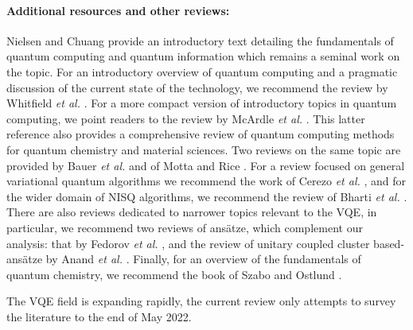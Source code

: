 \paragraph{Additional resources and other reviews:} Nielsen and Chuang \cite{nielsenQuantumComputationQuantum2010} provide an introductory text detailing the fundamentals of quantum computing and quantum information which remains a seminal work on the topic. For an introductory overview of quantum computing and a pragmatic discussion of the current state of the technology, we recommend the review by Whitfield {\it et al.} \cite{Whitfield2022}. For a more compact version of introductory topics in quantum computing, we point readers to the review by McArdle {\it et al.} \cite{mcardleQuantumComputationalChemistry2018}. This latter reference also provides a comprehensive review of quantum computing methods for quantum chemistry and material sciences. Two reviews on the same topic are provided by Bauer {\it et al.} \cite{bauerQuantumAlgorithmsQuantum2020} and of Motta and Rice \cite{Motta2021_review}. For a review focused on general variational quantum algorithms we recommend the work of Cerezo {\it et al.} \cite{cerezoVariationalQuantumAlgorithms2020}, and for the wider domain of NISQ algorithms, we recommend the review of Bharti {\it et al.} \cite{Bharti2021_review}. There are also reviews dedicated to narrower topics relevant to the VQE, in particular, we recommend two reviews of ans{\"{a}}tze, which complement our analysis: that by Fedorov {\it et al.} \cite{Fedorov2021}, and the review of unitary coupled cluster based-ans{\"{a}}tze by Anand {\it et al.} \cite{Anand2021_review}. Finally, for an overview of the fundamentals of quantum chemistry, we recommend the book of Szabo and Ostlund \cite{Szabo1996}.

The VQE field is expanding rapidly, the current review only attempts to survey the literature to the end of May 2022.